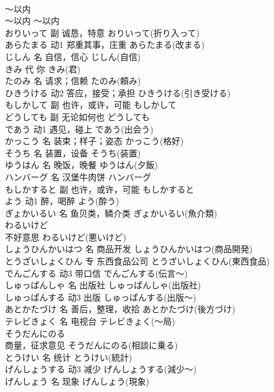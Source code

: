 \documentclass[8pt]{extreport}
\begin{document}
\begin{CJK}{UTF8}{min}
\\	～以内	
\\	～以内	～以内	
\\	おりいって	副	诚恳，特意	おりいって(折り入って)	
\\	あらたまる	动1	郑重其事，庄重	あらたまる(改まる)	
\\	じしん	名	自信，信心	じしん(自信)	
\\	きみ	代	你	きみ(君)	
\\	たのみ	名	请求；信赖	たのみ(頼み)	
\\	ひきうける	动2	答应，接受；承担	ひきうける(引き受ける)	
\\	もしかして	副	也许，或许，可能	もしかして	
\\	どうしても	副	无论如何也	どうしても	
\\	であう	动1	遇见，碰上	であう(出会う)	
\\	かっこう	名	装束；样子；姿态	かっこう(格好)	
\\	そうち	名	装置，设备	そうち(装置)	
\\	ゆうはん	名	晚饭，晚餐	ゆうはん(夕飯)	
\\	ハンバーグ	名	汉堡牛肉饼	ハンバーグ	
\\	もしかすると	副	也许，或许，可能	もしかすると	
\\	よう	动1	醉，喝醉	よう(酔う)	
\\	ぎょかいるい	名	鱼贝类，鳞介类	ぎょかいるい(魚介類)	
\\	わるいけど	
\\	不好意思	わるいけど(悪いけど)	
\\	しょうひんかいはつ	名	商品开发	しょうひんかいはつ(商品開発)	
\\	とうざいしょくひん	专	东西食品公司	とうざいしょくひん(東西食品)	
\\	でんごんする	动3	带口信	でんごんする(伝言～)	
\\	しゅっぱんしゃ	名	出版社	しゅっぱんしゃ(出版社)	
\\	しゅっぱんする	动3	出版	しゅっぱんする(出版～)	
\\	あとかたづけ	名	善后，整理，收拾	あとかたづけ(後方づけ)	
\\	テレビきょく	名	电视台	テレビきょく(～局)	
\\	そうだんにのる	
\\	商量，征求意见	そうだんにのる(相談に乗る)	
\\	とうけい	名	统计	とうけい(統計)	
\\	げんしょうする	动3	减少	げんしょうする(減少～)	
\\	げんしょう	名	现象	げんしょう(現象)	

\end{CJK}
\end{document}
